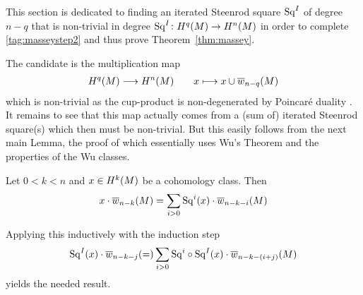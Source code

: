 This section is dedicated to finding an iterated Steenrod square
$\mathrm{Sq}^{I}$ of degree $n-q$ that is non-trivial in degree
$\mathrm{Sq}^{I}\colon H^q(M)\to H^n(M)$ in order to complete
\ref{tag:masseystep2}
and thus prove Theorem~\autoref{thm:massey}.

The candidate is the multiplication map
\begin{gather*}
  H^q(M) \longrightarrow H^n(M)
  \qquad
  x\longmapsto x\cup{\overline{w}_{n-q}}(M)
\end{gather*}
which is non-trivial as the cup-product is non-degenerated
by Poincaré duality \cite[Proposition~3.38]{hatcher}.
It remains to see that this map actually comes from a (sum of)
iterated Steenrod square(s) which then must be non-trivial.
But this easily follows from the next main Lemma,
the proof of which essentially uses Wu's Theorem and the properties of
the Wu classes.

\begin{Lem}\label{lem:masseystep2}
  Let $0<k<n$ and $x\in H^k(M)$ be a cohomology class.
  Then
  \begin{gather*}
    x\cdot{\overline{w}_{n-k}}(M) = \sum_{i>0}\mathrm{Sq}^{i}(x)\cdot{\overline{w}_{n-k-i}}(M)
  \end{gather*}
\end{Lem}
Applying this inductively with the induction step
\begin{gather*}
  \mathrm{Sq}^{I}(x)\cdot{\overline{w}_{n-k-j}}(=) \sum_{i>0}\mathrm{Sq}^{i}\circ\mathrm{Sq}^{I}(x)\cdot{\overline{w}_{n-k-(i+j)}}(M)
\end{gather*}
yields the needed result.

